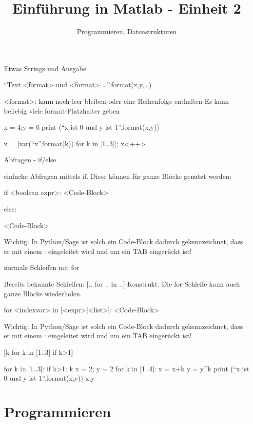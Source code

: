 \documentclass[hyperref={xetex}]{beamer}
\title{Einführung in Matlab - Einheit 2}
\subtitle{Programmieren, Datenstrukturen}
\begin{document}
\titlepage


Etwas Strings und Ausgabe

``Text {<format>} und {<format>} \ldots ''.format(x,y,\ldots)

 

    <format>: kann noch leer bleiben oder eine Reihenfolge enthalten
        Es kann beliebig viele format-Platzhalter geben

        x = 4;y = 6
        print (``x ist {0} und y ist {1}''.format(x,y))

        x = [var(``x{''.format(k)) for k in [1..3]]; x}<++>

Abfragen - if/else


einfache Abfragen mittels if. Diese können für ganze Blöcke genutzt werden:

if <boolean expr>:
    <Code-Block>

    else:

        <Code-Block>

         

        Wichtig: In Python/Sage ist solch ein Code-Block dadurch gekennzeichnet, dass er mit einem : eingeleitet wird und um ein TAB eingerückt ist!

        normale Schleifen mit for


        Bereits bekannte Schleifen: [.. for .. in ..]-Konstrukt. Die for-Schleife kann  auch ganze Blöcke wiederholen.

        for <indexvar> in [<expr>|<list>]:
            <Code-Block>

             

            Wichtig: In Python/Sage ist solch ein Code-Block dadurch gekennzeichnet, dass er mit einem : eingeleitet wird und um ein TAB eingerückt ist!

[k for k in [1..3] if k>1]

for k in [1..3]:
    if k>1:
            k
            x = 2; y = 2
            for k in [1..4]:
              x = x+k
                y = y^k
                        print (``x ist {0} und y ist {1}''.format(x,y))
                        x,y

\section{Programmieren}
 
\end{document}
